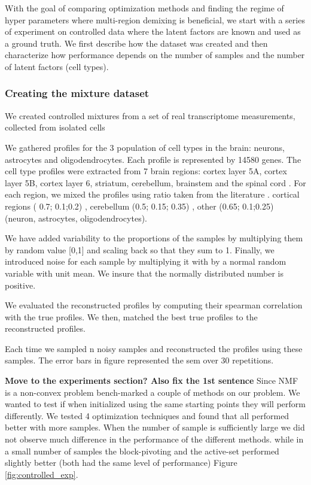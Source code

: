 

With the goal of comparing optimization methods and finding the regime of hyper parameters where multi-region demixing is beneficial, we start with a series of experiment on controlled data where the latent factors are known and used as a ground truth. We first describe how the dataset was created and then characterize how performance depends on the number of samples and the number of latent factors (cell types).


\subsubsection*{Creating the mixture dataset}
We created controlled mixtures from a set of real transcriptome measurements, collected from isolated cells



We gathered profiles for the 3 population of cell types in the brain: neurons, astrocytes and oligodendrocytes. Each profile is represented by 14580 genes. The cell type profiles were extracted from 7 brain regions:  cortex layer 5A, cortex layer 5B, cortex layer 6, striatum, cerebellum, brainstem and the spinal cord \cite{okaty2011cell}. For each region, we mixed the profiles using ratio taken from the literature \cite{Herculano2014}. cortical regions ( 0.7; 0.1;0.2) , cerebellum (0.5; 0.15; 0.35) , other (0.65;  0.1;0.25)  (neuron, astrocytes, oligodendrocytes).

We have added variability to the proportions of the samples by multiplying them by random value [0,1] and scaling back so that they sum to 1.
Finally, we introduced noise for each sample by multiplying it with by a normal random variable with unit mean. We insure that the normally distributed number is positive.

We evaluated the reconstructed profiles by computing their spearman correlation with the true profiles. We then, matched the best true profiles to the reconstructed profiles.

Each time we sampled n noisy samples and reconstructed the profiles using these samples. The error bars in figure  represented the sem over 30 repetitions.  

{\bf{Move to the experiments section? Also fix the 1st sentence}} Since NMF is a non-convex problem bench-marked a couple of methods on our problem. We wanted to test if when initialized using the same starting points they will perform differently. We tested 4 optimization techniques and found that all performed better with more samples. When the number of sample is sufficiently large we did not observe much difference in the performance of the different methods. while in a small number of samples the block-pivoting and the active-set performed slightly better (both had the same level of performance) Figure \ref{fig:controlled_exp}.

